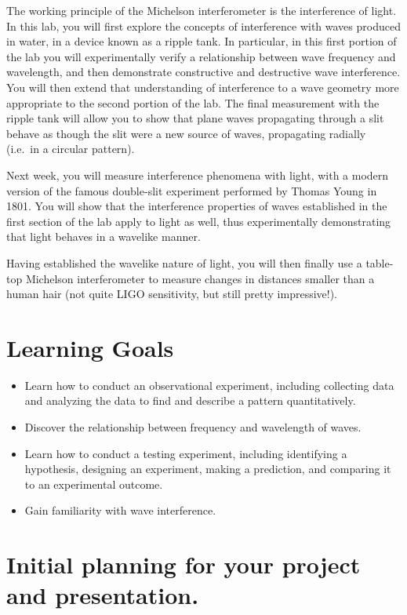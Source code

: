 The working principle of the Michelson interferometer is the interference of light.
In this lab, you will first explore the concepts of interference with waves produced in water, in a device known as a ripple tank.
In particular, in this first portion of the lab you will experimentally verify a relationship between wave frequency and wavelength, and then demonstrate constructive and destructive wave interference.
You will then extend that understanding of interference to a wave geometry more appropriate to the second portion of the lab.
The final measurement with the ripple tank will allow you to show that plane waves propagating through a slit behave as though the slit were a new source of waves, propagating radially (i.e.\ in a circular pattern).

Next week, you will measure interference phenomena with light, with a modern version of the famous double-slit experiment performed by Thomas Young in 1801.
You will show that the interference properties of waves established in the first section of the lab apply to light as well, thus experimentally demonstrating that light behaves in a wavelike manner.

Having established the wavelike nature of light, you will then finally use a table-top Michelson interferometer to measure changes in distances smaller than a human hair (not quite LIGO sensitivity, but still pretty impressive!).

\section{Learning Goals}

\begin{itemize}
	\item Learn how to conduct an observational experiment, including collecting data and analyzing the data to find and describe a pattern quantitatively.
	
	\item Discover the relationship between frequency and wavelength of waves.
	
	\item Learn how to conduct a testing experiment, including identifying a hypothesis, designing an experiment, making a prediction, and comparing it to an experimental outcome.
	
	\item Gain familiarity with wave interference.
\end{itemize}

\section{Initial planning for your project and presentation.}


